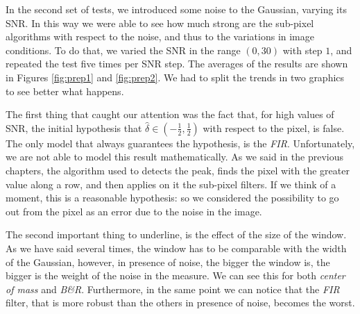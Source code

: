 In the second set of tests, we introduced some noise to the Gaussian, varying its \acs{SNR}. In this way we were able to see how much strong are the sub-pixel algorithms with respect to the noise, and thus to the variations in image conditions. To do that, we varied the \acs{SNR} in the range $\left( 0, 30 \right)$ with step $1$, and repeated the test five times per \acs{SNR} step. The averages of the results are shown in Figures \ref{fig:prep1} and \ref{fig:prep2}. We had to split the trends in two graphics to see better what happens. 

The first thing that caught our attention was the fact that, for high values of \acs{SNR}, the initial hypothesis that $\hat{\delta} \in \left( -\frac{1}{2}, \frac{1}{2} \right)$ with respect to the pixel, is false. The only model that always guarantees the hypothesis, is the \textit{FIR}. Unfortunately, we are not able to model this result mathematically. As we said in the previous chapters, the algorithm used to detects the peak, finds the pixel with the greater value along a row, and then applies on it the sub-pixel filters. If we think of a moment, this is a reasonable hypothesis: so we considered the possibility to go out from the pixel as an error due to the noise in the image.

The second important thing to underline, is the effect of the size of the window. As we have said several times, the window has to be comparable with the width of the Gaussian, however, in presence of noise, the bigger the window is, the bigger is the weight of the noise in the measure. We can see this for both \textit{center of mass} and \textit{B\&R}. Furthermore, in the same point we can notice that the \textit{FIR} filter, that is more robust than the others in presence of noise, becomes the worst. \\

